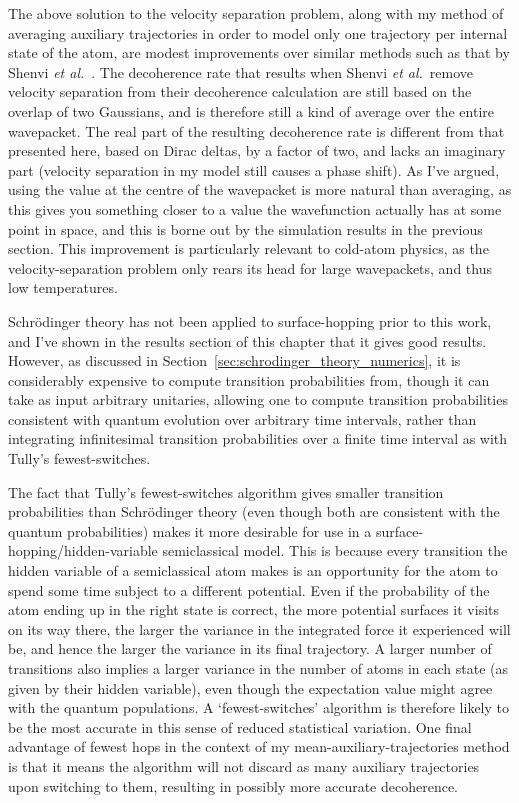 The above solution to the velocity separation problem, along with my method of averaging auxiliary trajectories in order to model only one trajectory per internal state of the atom, are modest improvements over similar methods such as that by Shenvi \emph{et al.}~\cite{doi:10.1063/1.3575588}. The decoherence rate that results when Shenvi \emph{et al.}~remove velocity separation from their decoherence calculation are still based on the overlap of two Gaussians, and is therefore still a kind of average over the entire wavepacket. The real part of the resulting decoherence rate is different from that presented here, based on Dirac deltas, by a factor of two, and lacks an imaginary part (velocity separation in my model still causes a phase shift). As I've argued, using the value at the centre of the wavepacket is more natural than averaging, as this gives you something closer to a value the wavefunction actually has at some point in space, and this is borne out by the simulation results in the previous section. This improvement is particularly relevant to cold-atom physics, as the velocity-separation problem only rears its head for large wavepackets, and thus low temperatures.

Schr\"odinger theory has not been applied to surface-hopping prior to this work, and I've shown in the results section of this chapter that it gives good results. However, as discussed in Section~\ref{sec:schrodinger_theory_numerics}, it is considerably expensive to compute transition probabilities from, though it can take as input arbitrary unitaries, allowing one to compute transition probabilities consistent with quantum evolution over arbitrary time intervals, rather than integrating infinitesimal transition probabilities over a finite time interval as with Tully's fewest-switches. 

The fact that Tully's fewest-switches algorithm gives smaller transition probabilities than Schr\"odinger theory (even though both are consistent with the quantum probabilities) makes it more desirable for use in a surface-hopping/hidden-variable semiclassical model. This is because every transition the hidden variable of a semiclassical atom makes is an opportunity for the atom to spend some time subject to a different potential. Even if the probability of the atom ending up in the right state is correct, the more potential surfaces it visits on its way there, the larger the variance in the integrated force it experienced will be, and hence the larger the variance in its final trajectory. A larger number of transitions also implies a larger variance in the number of atoms in each state (as given by their hidden variable), even though the expectation value might agree with the quantum populations. A `fewest-switches' algorithm is therefore likely to be the most accurate in this sense of reduced statistical variation. One final advantage of fewest hops in the context of my mean-auxiliary-trajectories method is that it means the algorithm will not discard as many auxiliary trajectories upon switching to them, resulting in possibly more accurate decoherence.

